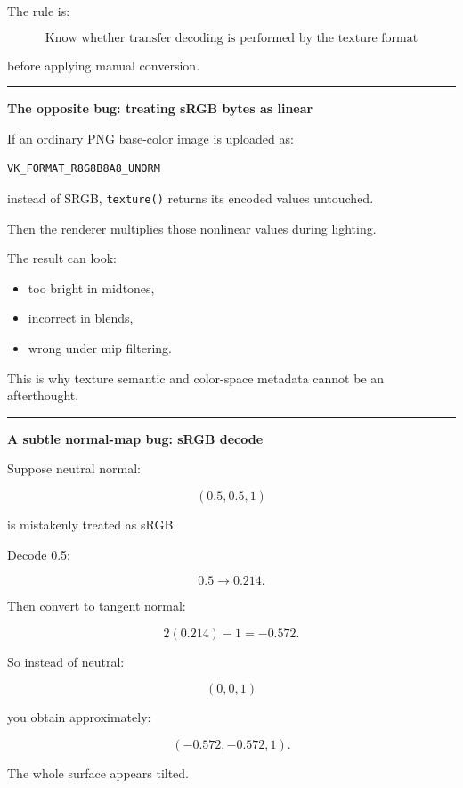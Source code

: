 The rule is:

\[
\boxed{
\text{Know whether transfer decoding is performed by the texture format}
}
\]

before applying manual conversion.

\begin{center}\rule{0.5\linewidth}{0.5pt}\end{center}

\textbf{The opposite bug: treating sRGB bytes as linear}

If an ordinary PNG base-color image is uploaded as:

\begin{verbatim}
VK_FORMAT_R8G8B8A8_UNORM
\end{verbatim}

instead of SRGB, \texttt{texture()} returns its encoded values untouched.

Then the renderer multiplies those nonlinear values during lighting.

The result can look:

\begin{itemize}
\tightlist
\item
  too bright in midtones,
\item
  incorrect in blends,
\item
  wrong under mip filtering.
\end{itemize}

This is why texture semantic and color-space metadata cannot be an afterthought.

\begin{center}\rule{0.5\linewidth}{0.5pt}\end{center}

\textbf{A subtle normal-map bug: sRGB decode}

Suppose neutral normal:

\[
(0.5,0.5,1)
\]

is mistakenly treated as sRGB.

Decode 0.5:

\[
0.5\rightarrow0.214.
\]

Then convert to tangent normal:

\[
2(0.214)-1
=
-0.572.
\]

So instead of neutral:

\[
(0,0,1)
\]

you obtain approximately:

\[
(-0.572,-0.572,1).
\]

The whole surface appears tilted.

